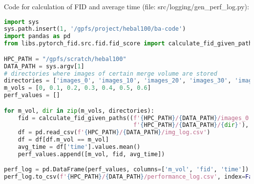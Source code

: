 \vfill
Code for calculation of FID and average time (file: src/logging/gen\_perf\_log.py):
\begin{lstlisting}[language=Python]
import sys       
sys.path.insert(1, '/gpfs/project/hebal100/ba-code')
import pandas as pd
from libs.pytorch_fid.src.fid.fid_score import calculate_fid_given_paths

HPC_PATH = "/gpfs/scratch/hebal100"
DATA_PATH = sys.argv[1] 
# directories where images of certain merge volume are stored
directories = ['images_0', 'images_10', 'images_20', 'images_30', 'images_40', 'images_50', 'images_60']
m_vols = [0, 0.1, 0.2, 0.3, 0.4, 0.5, 0.6]
perf_values = []

for m_vol, dir in zip(m_vols, directories):
    fid = calculate_fid_given_paths((f'{HPC_PATH}/{DATA_PATH}/images_0', 
                                     f'{HPC_PATH}/{DATA_PATH}/{dir}'), batch_size=50, device='cuda', dims=2048)
    df = pd.read_csv(f'{HPC_PATH}/{DATA_PATH}/img_log.csv')
    df = df[df.m_vol == m_vol]
    avg_time = df['time'].values.mean()
    perf_values.append([m_vol, fid, avg_time])

perf_log = pd.DataFrame(perf_values, columns=['m_vol', 'fid', 'time'])
perf_log.to_csv(f'{HPC_PATH}/{DATA_PATH}/performance_log.csv', index=False)
\end{lstlisting}
\vfill